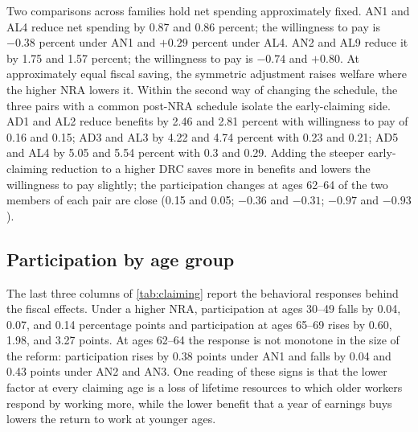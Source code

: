 Two comparisons across families hold net spending approximately fixed. AN1 and AL4 reduce net spending by 0.87 and 0.86 percent; the willingness to pay is $-0.38$ percent under AN1 and $+0.29$ percent under AL4. %
AN2 and AL9 reduce it by 1.75 and 1.57 percent; the willingness to pay is $-0.74$ and $+0.80$. %
At approximately equal fiscal saving, the symmetric adjustment raises welfare where the higher NRA lowers it. Within the second way of changing the schedule, the three pairs with a common post-NRA schedule isolate the early-claiming side. AD1 and AL2 reduce benefits by 2.46 and 2.81 percent with willingness to pay of 0.16 and 0.15; AD3 and AL3 by 4.22 and 4.74 percent with 0.23 and 0.21; AD5 and AL4 by 5.05 and 5.54 percent with 0.3 and 0.29. %
Adding the steeper early-claiming reduction to a higher DRC saves more in benefits and lowers the willingness to pay slightly; the participation changes at ages 62--64 of the two members of each pair are close (0.15 and 0.05; $-0.36$ and $-0.31$; $-0.97$ and $-0.93$). %

\subsection{Participation by age group}\label{subsec:participation}

The last three columns of \autoref{tab:claiming} report the behavioral responses behind the fiscal effects. Under a higher NRA, participation at ages 30--49 falls by 0.04, 0.07, and 0.14 percentage points and participation at ages 65--69 rises by 0.60, 1.98, and 3.27 points. %
At ages 62--64 the response is not monotone in the size of the reform: participation rises by 0.38 points under AN1 and falls by 0.04 and 0.43 points under AN2 and AN3. %
One reading of these signs is that the lower factor at every claiming age is a loss of lifetime resources to which older workers respond by working more, while the lower benefit that a year of earnings buys lowers the return to work at younger ages. %

